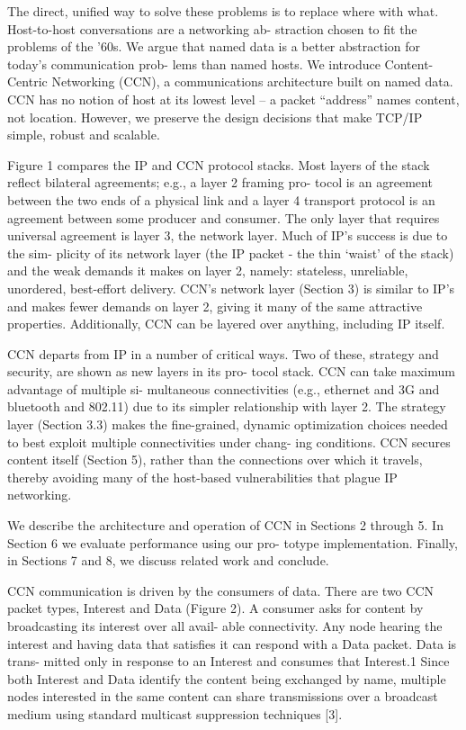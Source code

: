 \par
The direct, unified way to solve these problems is to replace where with what. Host-to-host conversations are a networking ab- straction chosen to fit the problems of the ’60s. We argue that named data is a better abstraction for today’s communication prob- lems than named hosts. We introduce Content-Centric Networking (CCN), a communications architecture built on named data. CCN has no notion of host at its lowest level – a packet “address” names content, not location. However, we preserve the design decisions that make TCP/IP simple, robust and scalable.
\par
Figure 1 compares the IP and CCN protocol stacks. Most layers of the stack reflect bilateral agreements; e.g., a layer 2 framing pro- tocol is an agreement between the two ends of a physical link and a layer 4 transport protocol is an agreement between some producer and consumer. The only layer that requires universal agreement is layer 3, the network layer. Much of IP’s success is due to the sim- plicity of its network layer (the IP packet - the thin ‘waist’ of the stack) and the weak demands it makes on layer 2, namely: stateless, unreliable, unordered, best-effort delivery. CCN’s network layer (Section 3) is similar to IP’s and makes fewer demands on layer 2, giving it many of the same attractive properties. Additionally, CCN can be layered over anything, including IP itself.
\par
CCN departs from IP in a number of critical ways. Two of these, strategy and security, are shown as new layers in its pro- tocol stack. CCN can take maximum advantage of multiple si- multaneous connectivities (e.g., ethernet and 3G and bluetooth and 802.11) due to its simpler relationship with layer 2. The strategy layer (Section 3.3) makes the fine-grained, dynamic optimization choices needed to best exploit multiple connectivities under chang- ing conditions. CCN secures content itself (Section 5), rather than the connections over which it travels, thereby avoiding many of the host-based vulnerabilities that plague IP networking.
\par
We describe the architecture and operation of CCN in Sections 2 through 5. In Section 6 we evaluate performance using our pro- totype implementation. Finally, in Sections 7 and 8, we discuss related work and conclude.
\par
CCN communication is driven by the consumers of data. There are two CCN packet types, Interest and Data (Figure 2). A consumer asks for content by broadcasting its interest over all avail- able connectivity. Any node hearing the interest and having data that satisfies it can respond with a Data packet. Data is trans- mitted only in response to an Interest and consumes that Interest.1 Since both Interest and Data identify the content being exchanged by name, multiple nodes interested in the same content can share transmissions over a broadcast medium using standard multicast suppression techniques [3].
